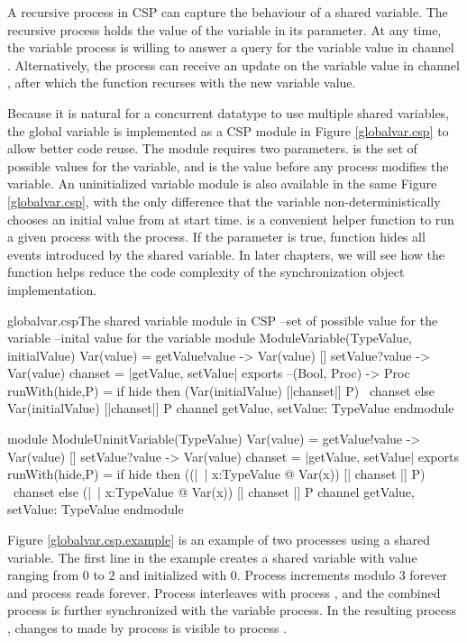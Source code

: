 \documentclass{article}
\begin{document}
A recursive process in CSP can capture the behaviour of a shared variable. The recursive process holds the value of the variable in its parameter. At any time, the variable process is willing to answer a query for the variable value in channel . Alternatively, the process can receive an update on the variable value in channel , after which the function recurses with the new variable value.

Because it is natural for a concurrent datatype to use multiple shared variables, the global variable is implemented as a CSP module in Figure \ref{globalvar.csp} to allow better code reuse. The module requires two parameters.  is the set of possible values for the variable, and  is the value before any process modifies the variable. An uninitialized variable module is also available in the same Figure \ref{globalvar.csp}, with the only difference that the variable non-deterministically chooses an initial value from  at start time.  is a convenient helper function to run a given process  with the  process. If the parameter  is true,  function hides all events introduced by the shared variable. In later chapters, we will see how the  function helps reduce the code complexity of the synchronization object implementation.

\begin{cspfloat}{globalvar.csp}{The shared variable module in CSP}
--set of possible value for the variable
--inital value for the variable
module ModuleVariable(TypeValue, initialValue)
  Var(value) = getValue!value -> Var(value)
             [] setValue?value -> Var(value)
  chanset = {|getValue, setValue|}
exports
  --(Bool, Proc) -> Proc
  runWith(hide,P) = if hide then (Var(initialValue) [|chanset|] P) \ chanset
                            else  Var(initialValue) [|chanset|] P
  channel getValue, setValue: TypeValue
endmodule

module ModuleUninitVariable(TypeValue)
  Var(value) = getValue!value -> Var(value)
            [] setValue?value -> Var(value)
  chanset = {|getValue, setValue|}
exports
  runWith(hide,P) = 
    if hide then ((|~| x:TypeValue @ Var(x)) [| chanset |] P) \ chanset
    else (|~| x:TypeValue @ Var(x)) [| chanset |] P
  channel getValue, setValue: TypeValue
endmodule
\end{cspfloat}

Figure \ref{globalvar.csp.example} is an example of two processes using a shared variable. The first line in the example creates a shared variable  with value ranging from $0$ to $2$ and initialized with $0$. Process  increments  modulo $3$ forever and process  reads  forever. Process  interleaves with process , and the combined process is further synchronized with the variable  process. In the resulting process , changes to  made by process  is visible to process .
\end{document}
